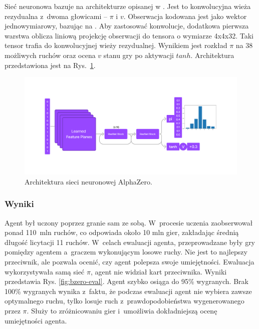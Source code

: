 Sieć neuronowa bazuje na architekturze opisanej w \cite{AlphaZeroPaper}.
Jest to konwolucyjna wieża rezydualna z~dwoma głowicami -- $\pi$ i $v$.
Obserwacja kodowana jest jako wektor jednowymiarowy,
bazując na \cite{lockhart20}.
Aby zastosować konwolucje, dodatkowa pierwsza warstwa
oblicza liniową projekcję obserwacji do tensora
o wymiarze 4x4x32. Taki tensor trafia do konwolucyjnej wieży rezydualnej.
Wynikiem jest rozkład $\pi$ na 38 możliwych ruchów oraz
ocena $v$ stanu gry po aktywacji $tanh$.
Architektura przedstawiona jest na Rys.~\ref{fig:ai-arch}.

\begin{figure}[h!]
    \centering
    \includegraphics[width=\textwidth]{img/ai/arch.png}
    \caption{Architektura sieci neuronowej AlphaZero.}
    \label{fig:ai-arch}
\end{figure}

\subsubsection{Wyniki}



Agent był uczony poprzez granie sam ze sobą.
W~procesie uczenia zaobserwował ponad 110~mln ruchów,
co odpowiada około 10 mln gier, zakładając średnią
długość licytacji 11 ruchów.
W~celach ewaluacji agenta, przeprowadzane
były gry pomiędzy agentem a~graczem wykonującym
losowe ruchy.
Nie jest to najlepszy przeciwnik, ale pozwala
ocenić, czy agent polepsza swoje umiejętności.
Ewaluacja wykorzystywała samą sieć $\pi$,
agent nie widział kart przeciwnika.
Wyniki przedstawia Rys. \ref{fig:bzero-eval}.
Agent szybko osiąga do 95\% wygranych.
Brak 100\% wygranych wynika z~faktu, że
podczas ewaluacji agent nie wybiera zawsze optymalnego ruchu,
tylko losuje ruch z~prawdopodobieństwa
wygenerowanego przez $\pi$.
Służy to zróżnicowaniu gier i~umożliwia
dokładniejszą ocenę umiejętności agenta.

